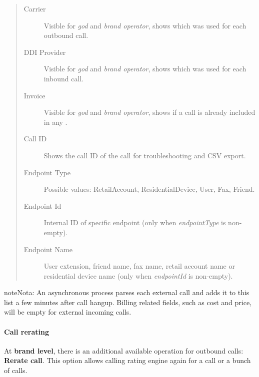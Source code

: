 \documentclass[letterpaper,10pt,spanish]{sphinxmanual}
\begin{document}
\begin{quote}
\begin{description}
\item[{Carrier}] \leavevmode
Visible for \emph{god} and \emph{brand operator}, shows which {\hyperref[administration_portal/brand/providers/carriers:carriers]{}} was used for each outbound call.

\item[{DDI Provider}] \leavevmode
Visible for \emph{god} and \emph{brand operator}, shows which {\hyperref[administration_portal/brand/providers/ddi_providers:ddi\string-providers]{}} was used for each inbound call.

\item[{Invoice}] \leavevmode
Visible for \emph{god} and \emph{brand operator}, shows if a call is already included in any {\hyperref[administration_portal/brand/invoicing/invoices:invoices]{}}.

\item[{Call ID}] \leavevmode
Shows the call ID of the call for troubleshooting and CSV export.

\item[{Endpoint Type}] \leavevmode
Possible values: RetailAccount, ResidentialDevice, User, Fax, Friend.

\item[{Endpoint Id}] \leavevmode
Internal ID of specific endpoint (only when \emph{endpointType} is non-empty).

\item[{Endpoint Name}] \leavevmode
User extension, friend name, fax name, retail account name or residential device name (only when \emph{endpointId} is non-empty).

\end{description}
\end{quote}

\begin{notice}{note}{Nota:}
An asynchronous process parses each external call and adds it to this list a few minutes after call hangup. Billing related fields, such as cost and price, will be empty for external incoming calls.
\end{notice}


\paragraph{Call rerating}
\label{administration_portal/client/retail/calls/external_calls:call-rerating}
At \textbf{brand level}, there is an additional available operation for outbound calls: \textbf{Rerate call}. This option allows calling rating engine again for a call or a bunch of calls.
\end{document}
